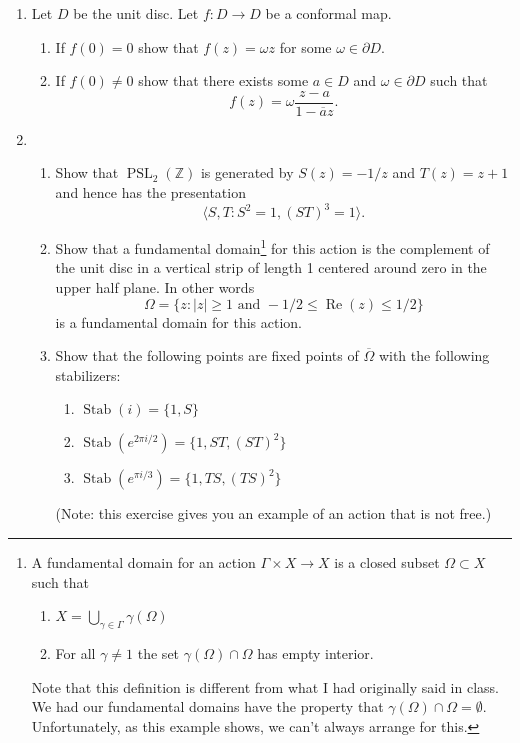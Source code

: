 \documentclass[a4paper,10pt]{article}
\newcommand{\ZZ}{\mathbb{Z}}
\newcommand{\PSL}{\operatorname{PSL}}
\newcommand{\Stab}{\operatorname{Stab}}
\renewcommand{\Re}{\operatorname{Re}}
\begin{document}
\begin{enumerate}
\item Let $D$ be the unit disc. Let $f: D \to D$ be a conformal map. 
\begin{enumerate}
	\item If $f(0) = 0$ show that $f(z) = \omega z$ for some $\omega \in \partial D$. 
	\item If $f(0) \neq 0$ show that there exists some $a \in D$ and $\omega \in \partial D$ such that 
	$$ f(z) = \omega \frac{z - a}{1 - \overline{a} z}.$$
\end{enumerate}

\item 
\begin{enumerate}
	
	\item Show that $\PSL_2(\ZZ)$ is generated by $S(z) = -1/z$ and $T(z) = z+1$ and hence has the presentation
	$$ \langle S, T : S^2 = 1, (ST)^3 = 1 \rangle. $$
	
	\item Show that a fundamental domain\footnote{A fundamental domain for an action $\Gamma \times X \to X$ is a closed subset $\Omega \subset X$ such that 
		\begin{enumerate}
			\item $X = \bigcup_{\gamma \in \Gamma} \gamma(\Omega)$
			\item For all $\gamma \neq 1$ the set $\gamma(\Omega) \cap \Omega$ has empty interior.
		\end{enumerate}
		Note that this definition is different from what I had originally said in class. We had our fundamental domains have the property that $\gamma(\Omega) \cap \Omega = \emptyset.$ Unfortunately, as this example shows, we can't always arrange for this.   
	} for this action is the complement of the unit disc in a vertical strip of length 1 centered around zero in the upper half plane. In other words
	$$ \Omega =  \lbrace z: \vert z \vert \geq 1 \mbox{ and } -1/2\leq \Re(z) \leq 1/2 \rbrace$$ is a fundamental domain for this action.  
	
	\item 
	Show that the following points are fixed points of $\overline{\Omega}$ with the following stabilizers:
	\begin{enumerate}
		\item $\Stab(i) = \lbrace 1, S\rbrace$
		\item $\Stab(e^{2\pi i/2}) = \lbrace 1, ST, (ST)^2 \rbrace $
		\item $\Stab(e^{\pi i/3}) = \lbrace 1, TS, (TS)^2 \rbrace $
	\end{enumerate}
	(Note: this exercise gives you an example of an action that is not free.)
\end{enumerate}

\end{enumerate}
\end{document}
